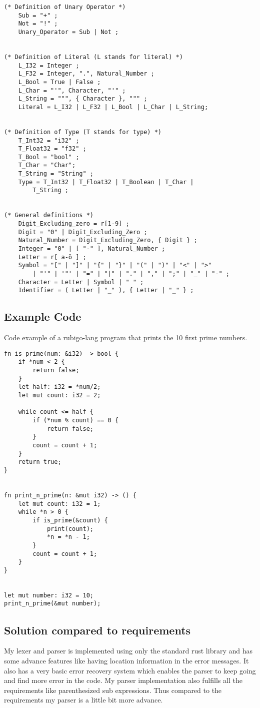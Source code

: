 \documentclass[12pt]{article}
\begin{document}
\begin{verbatim}
(* Definition of Unary Operator *)
    Sub = "+" ;
    Not = "!" ;
    Unary_Operator = Sub | Not ;


(* Definition of Literal (L stands for literal) *)
    L_I32 = Integer ;
    L_F32 = Integer, ".", Natural_Number ;
    L_Bool = True | False ;
    L_Char = "'", Character, "'" ;
    L_String = """, { Character }, """ ;  
    Literal = L_I32 | L_F32 | L_Bool | L_Char | L_String;


(* Definition of Type (T stands for type) *)
    T_Int32 = "i32" ;
    T_Float32 = "f32" ;
    T_Bool = "bool" ;
    T_Char = "Char";
    T_String = "String" ;  
    Type = T_Int32 | T_Float32 | T_Boolean | T_Char |
        T_String ;


(* General definitions *)
    Digit_Excluding_zero = r[1-9] ;
    Digit = "0" | Digit_Excluding_Zero ;
    Natural_Number = Digit_Excluding_Zero, { Digit } ;
    Integer = "0" | [ "-" ], Natural_Number ;
    Letter = r[ a-ö ] ;
    Symbol = "[" | "]" | "{" | "}" | "(" | ")" | "<" | ">"
        | "'" | '"' | "=" | "|" | "." | "," | ";" | "_" | "-" ;
    Character = Letter | Symbol | " " ;
    Identifier = ( Letter | "_" ), { Letter | "_" } ;
	\end{verbatim}

    \subsection{Example Code}
    Code example of a rubigo-lang program that prints the 10 first prime numbers.
	\begin{verbatim}
fn is_prime(num: &i32) -> bool {
    if *num < 2 {
        return false;
    }
    let half: i32 = *num/2;
    let mut count: i32 = 2;

    while count <= half {
        if (*num % count) == 0 {
            return false;
        }
        count = count + 1;
    }
    return true;
}


fn print_n_prime(n: &mut i32) -> () {
    let mut count: i32 = 1;
    while *n > 0 {
        if is_prime(&count) {
            print(count);
            *n = *n - 1;
        }
        count = count + 1;
    }
}


let mut number: i32 = 10;
print_n_prime(&mut number);

	\end{verbatim}


    \subsection{Solution compared to requirements}
 	My lexer and parser is implemented using only the standard rust library and has some advance features like having location information in the error messages. It also has a very basic error recovery system which enables the parser to keep going and find more error in the code. My parser implementation also fulfills all the requirements like parenthesized sub expressions. Thus compared to the requirements my parser is a little bit more advance.
\end{document}
